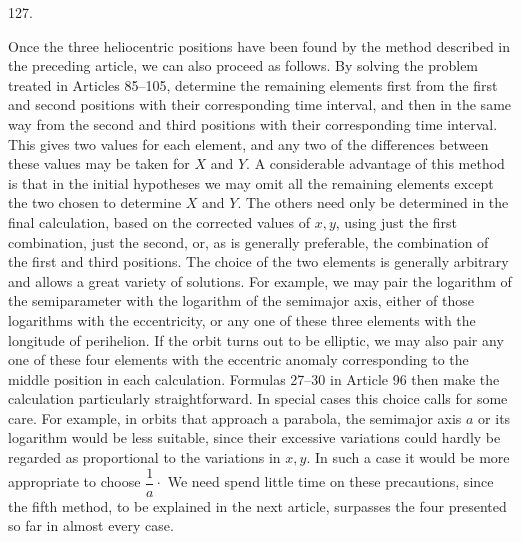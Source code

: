 \par{}\medskip
\begin{center}\hypertarget{native-174-article127}{}127.\end{center}
Once the three heliocentric positions have been found by the method described in the preceding
article, we can also proceed as follows. By solving the problem treated in Articles 85–105,
determine the remaining elements first from the first and second positions with their corresponding
time interval, and then in the same way from the second and third positions with their corresponding
time interval. This gives two values for each element, and any two of the differences between these
values may be taken for $X$ and $Y$. A considerable advantage of this method is that in the initial
hypotheses we may omit all the remaining elements except the two chosen to determine $X$ and $Y$.
The others need only be determined in the final calculation, based on the corrected values of $x,y$,
using just the first combination, just the second, or, as is generally preferable, the combination
of the first and third positions. The choice of the two elements is generally arbitrary and allows a
great variety of solutions. For example, we may pair the logarithm of the semiparameter with the
logarithm of the semimajor axis, either of those logarithms with the eccentricity, or any one of
these three elements with the longitude of perihelion. If the orbit turns out to be elliptic, we may
also pair any one of these four elements with the eccentric anomaly corresponding to the middle
position in each calculation. Formulas 27–30 in Article 96 then make the calculation particularly
straightforward. In special cases this choice calls for some care. For example, in orbits that
approach a parabola, the semimajor axis $a$ or its logarithm would be less suitable, since their
excessive variations could hardly be regarded as proportional to the variations in $x,y$. In such a
case it would be more appropriate to choose $\dfrac{1}{a}\mathpunct{\cdot}$ We need spend little time on these precautions,
since the fifth method, to be explained in the next article, surpasses the four presented so far in
almost every case.

